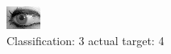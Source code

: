 \begin{figure}[h!]
\begin{center}
\includegraphics[width=0.60\columnwidth]{figures/ID2049_class_3_target_4.png}
\end{center}
\caption{ Classification: 3 actual target: 4}
\label{fig:ID2049_class_3_target_4}
\end{figure}
